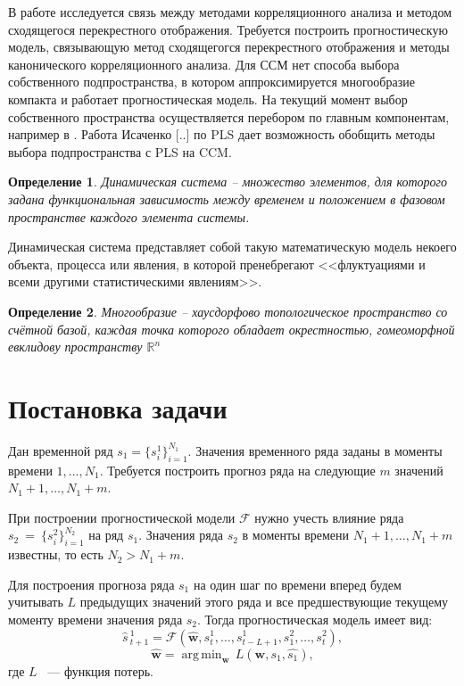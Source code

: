 \documentclass[12pt]{extarticle}
\newtheorem{definition}{Определение}
\DeclareMathOperator*{\argmin}{arg\,min}
\newcommand{\bbr}{\mathbb{R}}
\begin{document}
В работе исследуется связь между методами корреляционного анализа и методом сходящегося перекрестного отображения. Требуется построить прогностическую модель, связывающую метод сходящегогся перекрестного отображения и методы канонического корреляционного анализа.
Для ССМ нет способа выбора собственного подпространства, в котором аппроксимируется многообразие компакта и работает прогностическая модель. На текущий момент выбор собственного пространства осуществляется перебором по главным компонентам, например в \cite{usmanova}. Работа Исаченко [..] по PLS дает возможность обобщить методы выбора подпространства с PLS на CCM.

\begin{definition}
Динамическая система -- множество элементов, для которого задана функциональная зависимость между временем и положением в фазовом пространстве каждого элемента системы.
\end{definition}
Динамическая система представляет собой такую математическую модель некоего объекта, процесса или явления, в которой пренебрегают <<флуктуациями и всеми другими статистическими явлениям>>.
\begin{definition}
Многообразие -- хаусдорфово топологическое пространство со счётной базой, каждая точка которого обладает окрестностью, гомеоморфной евклидову пространству $\bbr^n$
\end{definition}


\section{Постановка задачи}
Дан временной ряд $s_1 = \{s_i^1 \}_{i=1}^{N_1} $. Значения временного ряда заданы в моменты времени $1, \dots, N_1$. Требуется построить прогноз ряда на следующие $m$ значений $N_1+1, \dots, N_1+m$. 

При построении прогностической модели $\mathcal{F}$ нужно учесть влияние ряда $s_2~=~\{ s_i^2\}_{i=1}^{N_2}$ на ряд $s_1$. Значения ряда $s_2$ в моменты времени $N_1+1, \dots, N_1+m$ известны, то есть $N_2 > N_1 + m$.

Для построения прогноза ряда $s_1$ на один шаг по времени вперед будем учитывать $L$ предыдущих значений этого ряда и все предшествующие текущему моменту времени значения ряда $s_2$. Тогда прогностическая модель имеет вид:
\begin{equation}
    \widehat{s}\,_{t+1}^1 = \mathcal{F}(\widehat{\mathbf{w}}, s_{t}^1, \dots, s_{t-L+1}^1, s_1^2, \dots, s_t^2),
    \label{eq:F}
\end{equation}
    \[\widehat{\mathbf{w}} = \argmin_{\mathbf{w}}\,L(\mathbf{w}, s_1, \widehat{s_1}),\]
где $L$ ~--- функция потерь.
\end{document}
